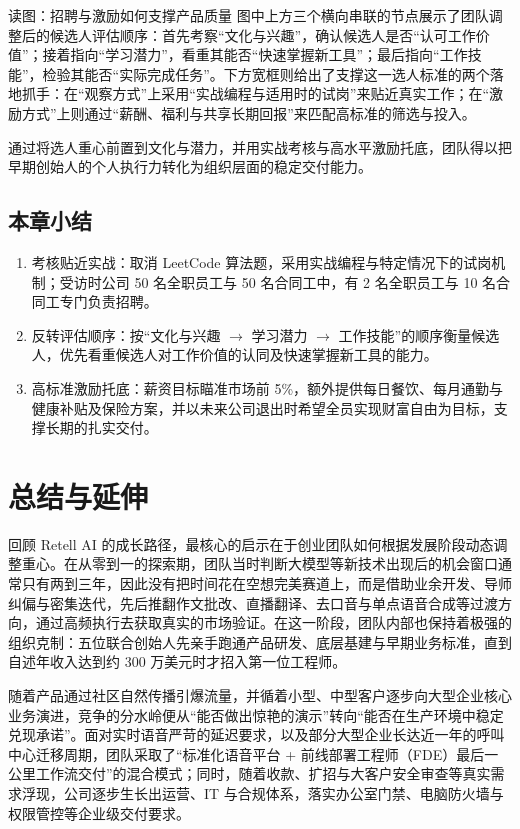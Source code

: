 \documentclass[UTF8,a4paper,11pt,fontset=fandol]{ctexart}
\begin{document}
\begin{knowledgebox}{读图：招聘与激励如何支撑产品质量}
图中上方三个横向串联的节点展示了团队调整后的候选人评估顺序：首先考察“文化与兴趣”，确认候选人是否“认可工作价值”；接着指向“学习潜力”，看重其能否“快速掌握新工具”；最后指向“工作技能”，检验其能否“实际完成任务”。下方宽框则给出了支撑这一选人标准的两个落地抓手：在“观察方式”上采用“实战编程与适用时的试岗”来贴近真实工作；在“激励方式”上则通过“薪酬、福利与共享长期回报”来匹配高标准的筛选与投入。
\end{knowledgebox}
通过将选人重心前置到文化与潜力，并用实战考核与高水平激励托底，团队得以把早期创始人的个人执行力转化为组织层面的稳定交付能力。
\subsection{本章小结}
\begin{enumerate}
\item 考核贴近实战：取消 LeetCode 算法题，采用实战编程与特定情况下的试岗机制；受访时公司 50 名全职员工与 50 名合同工中，有 2 名全职员工与 10 名合同工专门负责招聘。
\item 反转评估顺序：按“文化与兴趣 \ensuremath{\rightarrow} 学习潜力 \ensuremath{\rightarrow} 工作技能”的顺序衡量候选人，优先看重候选人对工作价值的认同及快速掌握新工具的能力。
\item 高标准激励托底：薪资目标瞄准市场前 5\%，额外提供每日餐饮、每月通勤与健康补贴及保险方案，并以未来公司退出时希望全员实现财富自由为目标，支撑长期的扎实交付。
\end{enumerate}
\section{总结与延伸}
回顾 Retell AI 的成长路径，最核心的启示在于创业团队如何根据发展阶段动态调整重心。在从零到一的探索期，团队当时判断大模型等新技术出现后的机会窗口通常只有两到三年，因此没有把时间花在空想完美赛道上，而是借助业余开发、导师纠偏与密集迭代，先后推翻作文批改、直播翻译、去口音与单点语音合成等过渡方向，通过高频执行去获取真实的市场验证。在这一阶段，团队内部也保持着极强的组织克制：五位联合创始人先亲手跑通产品研发、底层基建与早期业务标准，直到自述年收入达到约 300 万美元时才招入第一位工程师。

随着产品通过社区自然传播引爆流量，并循着小型、中型客户逐步向大型企业核心业务演进，竞争的分水岭便从“能否做出惊艳的演示”转向“能否在生产环境中稳定兑现承诺”。面对实时语音严苛的延迟要求，以及部分大型企业长达近一年的呼叫中心迁移周期，团队采取了“标准化语音平台 + 前线部署工程师（FDE）最后一公里工作流交付”的混合模式；同时，随着收款、扩招与大客户安全审查等真实需求浮现，公司逐步生长出运营、IT 与合规体系，落实办公室门禁、电脑防火墙与权限管控等企业级交付要求。
\end{document}
